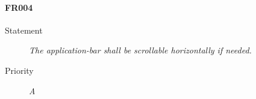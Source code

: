 \paragraph{FR004}
  \begin{description}
  \item [Statement] 
    \textit{ The application-bar shall be scrollable horizontally if needed.}
  \item [Priority] \textit{A}
\end{description}